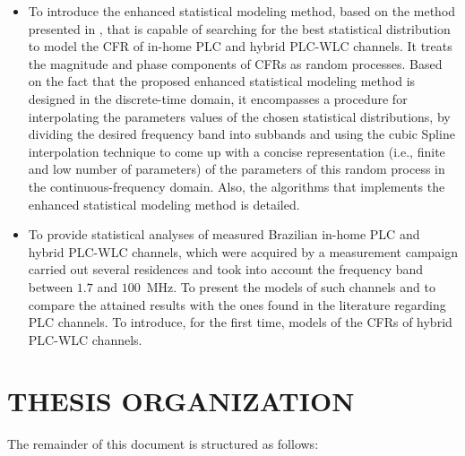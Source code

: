 \begin{itemize}
	\item To introduce the enhanced statistical modeling method, based on the method presented in \cite{Luis:AI,Luis:doc}, that is capable of searching for the best statistical distribution to model the \ac{CFR} of in-home \ac{PLC} and hybrid \ac{PLC}-\ac{WLC} channels. It treats the magnitude and phase components of \acp{CFR} as random processes. Based on the fact that the proposed enhanced statistical modeling method is designed in the discrete-time domain, it encompasses a procedure for interpolating the parameters values of the chosen statistical distributions, by dividing the desired frequency band into subbands and using the cubic Spline interpolation technique to come up with a concise representation (i.e., finite and low number of parameters) of the parameters of this random process in the continuous-frequency domain. Also, the algorithms that implements the enhanced statistical modeling method is detailed. 
	
	\item To provide statistical analyses of measured Brazilian in-home \ac{PLC} and hybrid \ac{PLC}-\ac{WLC} channels, which were acquired by a measurement campaign carried out several residences and took into account the frequency band between $1.7$ and $100$~MHz. To present the models of such channels and to compare the attained results with the ones found in the literature regarding \ac{PLC} channels. To introduce, for the first time, models of the \acp{CFR} of hybrid \ac{PLC}-\ac{WLC} channels. 
\end{itemize}

\section{THESIS ORGANIZATION} \label{sec:I2}

The remainder of this document is structured as follows: 

